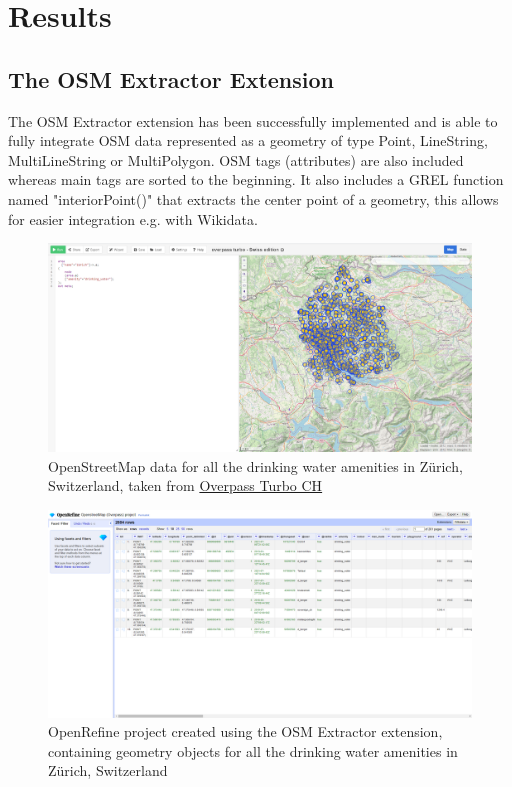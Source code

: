 \section*{Results}
\subsection*{The OSM Extractor Extension}
The OSM Extractor extension has been
successfully implemented and is able to fully integrate
OSM data represented as a geometry of type Point,
LineString, MultiLineString or MultiPolygon. OSM tags
(attributes) are also included whereas main tags are
sorted to the beginning. It also includes a GREL
function named "interiorPoint()" that extracts the
center point of a geometry, this allows for easier
integration e.g. with
Wikidata.
\begin{figure}[H]
        \includegraphics[width=\textwidth]{./Figures/ManagementSummary/osm_extractor_overpass_query}
        \caption{OpenStreetMap data for all the drinking water amenities in Zürich, Switzerland, taken from \href{http://overpass-turbo.osm.ch/}{Overpass Turbo CH}}
\end{figure}
\begin{figure}[H]
    \includegraphics[width=\textwidth]{./Figures/ManagementSummary/osm_extractor_project}
    \caption{OpenRefine project created using the OSM Extractor extension, containing geometry objects for all the drinking water amenities in Zürich, Switzerland}
\end{figure}
